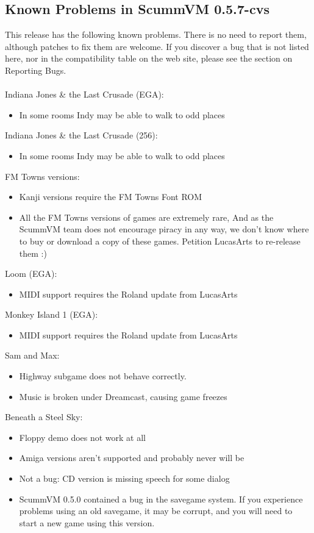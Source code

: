 

\subsection{Known Problems in ScummVM 0.5.7-cvs}

This release has the following known problems. There is no need to report them,
although patches to fix them are welcome. If you discover a bug that is not
listed here, nor in the compatibility table on the web site, please see
the section on Reporting Bugs.\\
\quad \\
Indiana Jones \& the Last Crusade (EGA):
  \begin{itemize}
  \item In some rooms Indy may be able to walk to odd places
  \end{itemize}
Indiana Jones \& the Last Crusade (256):
  \begin{itemize}
  \item In some rooms Indy may be able to walk to odd places
  \end{itemize}
FM Towns versions:
  \begin{itemize}
  \item Kanji versions require the FM Towns Font ROM
  \item All the FM Towns versions of games are extremely rare,
                  And as the ScummVM team does not encourage piracy in any
                  way, we don't know where to buy or download a copy of these
                  games. Petition LucasArts to re-release them :)
  \end{itemize}
Loom (EGA):
  \begin{itemize}
  \item MIDI support requires the Roland update from LucasArts
  \end{itemize}
Monkey Island 1 (EGA):
  \begin{itemize}
  \item MIDI support requires the Roland update from LucasArts
  \end{itemize}
Sam and Max:
  \begin{itemize}
  \item Highway subgame does not behave correctly.
  \item Music is broken under Dreamcast, causing game freezes
  \end{itemize}
Beneath a Steel Sky:
  \begin{itemize}
  \item Floppy demo does not work at all
  \item Amiga versions aren't supported and probably never will be
  \item Not a bug: CD version is missing speech for some dialog
  \item ScummVM 0.5.0 contained a bug in the savegame system.
                  If you experience problems using an old savegame, it may be
                  corrupt, and you will need to start a new game using this
                  version.
  \end{itemize}
